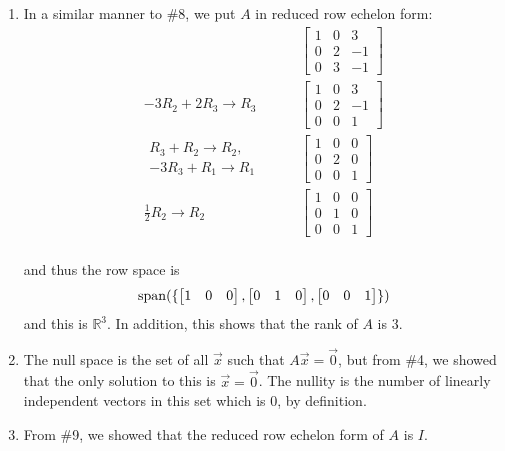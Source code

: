\begin{example}
\begin{enumerate}
\item In a similar manner to \#8, we put $A$ in reduced row echelon form:
%
\begin{align*}
\qquad & \begin{bmatrix}
1 & 0 & 3 \\
0 & 2 & -1 \\
0 & 3 & -1
\end{bmatrix} \\
-3 R_2 +2 R_3 \rightarrow R_3 \qquad &
\begin{bmatrix}
1 & 0 & 3 \\
0 & 2 & -1\\
0 & 0 & 1
\end{bmatrix} \\
\begin{array}{r}
R_3 + R_2 \rightarrow R_2, \\
-3R_3 + R_1 \rightarrow R_1
\end{array} \qquad &
\begin{bmatrix}
1 & 0 & 0 \\
0 & 2 & 0 \\
0 & 0 & 1
\end{bmatrix} \\
\frac{1}{2} R_2 \rightarrow R_2 \qquad &
\begin{bmatrix}
1 & 0 & 0 \\
0 & 1 & 0 \\
0 & 0 & 1
\end{bmatrix} \\
\end{align*}

and thus the row space is
%
\begin{align*}
\operatorname{span}(\{ \begin{bmatrix}
1 & 0 & 0
\end{bmatrix},\begin{bmatrix}
0 & 1 & 0
\end{bmatrix},\begin{bmatrix}
0 & 0 & 1
\end{bmatrix} \})
\end{align*}
and this is $\mathbb{R}^3$.  In addition, this shows that the rank of $A$ is 3.


\item The null space is the set of all $\vec{x}$ such that $A\vec{x}=\vec{0}$, but from \#4, we showed that the only solution to this is $\vec{x}=\vec{0}$.    The nullity is the number of linearly independent vectors in this set which is 0, by definition.

\item From \#9, we showed that the reduced row echelon form of $A$ is $I$.
\end{enumerate}

\end{example}


